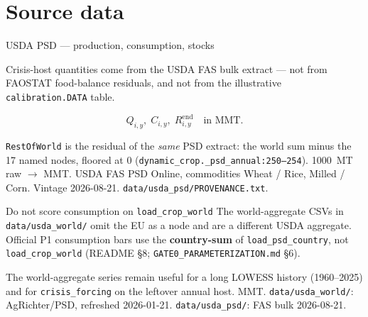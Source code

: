 \section{Source data}

\begin{frame}{USDA PSD --- production, consumption, stocks}

Crisis-host quantities come from the USDA FAS bulk extract --- not from
FAOSTAT food-balance residuals, and not from the illustrative
\texttt{calibration.DATA} table.

\[
Q_{i,y},\; C_{i,y},\; R_{i,y}^{\mathrm{end}} \quad\text{in MMT}.
\]

\texttt{RestOfWorld} is the residual of the \emph{same} PSD extract: the
world sum minus the 17 named nodes, floored at 0
(\texttt{dynamic\_crop.\_psd\_annual:250--254}).
{1000~MT raw $\to$ MMT.}
{USDA FAS PSD Online, commodities Wheat / Rice, Milled / Corn.
Vintage 2026-08-21. \texttt{data/usda\_psd/PROVENANCE.txt}.}
\end{frame}

\begin{frame}{Do not score consumption on \texttt{load\_crop\_world}}
The world-aggregate CSVs in \texttt{data/usda\_world/} omit the EU as a
node and are a different USDA aggregate. Official P1 consumption bars use
the \textbf{country-sum} of \texttt{load\_psd\_country}, not
\texttt{load\_crop\_world} (README \S8;
\texttt{GATE0\_PARAMETERIZATION.md} \S6).

The world-aggregate series remain useful for a long LOWESS history
(1960--2025) and for \texttt{crisis\_forcing} on the leftover annual host.
{MMT.}
{\texttt{data/usda\_world/}: AgRichter/PSD, refreshed 2026-01-21.
\texttt{data/usda\_psd/}: FAS bulk 2026-08-21.}
\end{frame}

